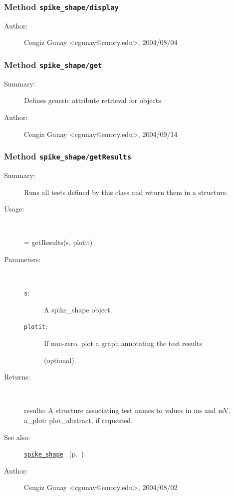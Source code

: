 \subsubsection[Method \texttt{display}]{Method \texttt{spike\_shape/display}}%
%
\label{ref_spike_shape__display}%
\hypertarget{ref_spike_shape__display}{}%
\begin{description}
%
%
%
%
%
%
%
\item[Author:]%
Cengiz Gunay <cgunay@emory.edu>, 2004/08/04
%
\end{description}
\methodline%
\subsubsection[Method \texttt{get}]{Method \texttt{spike\_shape/get}}%
%
\label{ref_spike_shape__get}%
\hypertarget{ref_spike_shape__get}{}%
\begin{description}
\item[Summary:]Defines generic attribute retrieval for objects.
%
%
%
%
%
%
%
\item[Author:]%
Cengiz Gunay <cgunay@emory.edu>, 2004/09/14
%
\end{description}
\methodline%
\subsubsection[Method \texttt{getResults}]{Method \texttt{spike\_shape/getResults}}%
%
\label{ref_spike_shape__getResults}%
\hypertarget{ref_spike_shape__getResults}{}%
\begin{description}
\item[Summary:]Runs all tests defined by this class and return them in a 
		structure.
%
\item[Usage:]~%
\begin{lyxcode}%
[results, a\_plot] = getResults(s, plotit)
%
\end{lyxcode}%
%
%
\item[Parameters:]~
\begin{description}%
\item[\texttt{s}:]
 A spike\_shape object.
\item[\texttt{plotit}:]
 If non-zero, plot a graph annotating the test results 

(optional).
\end{description}%
%
\item[Returns:
]~

	results: A structure associating test names to values in ms and mV.
	a\_plot: plot\_abstract, if requested.
%
%
\item[See also:]%
\hyperlink{ref_spike_shape}{\texttt{spike\_shape}}%
\ (p.~\pageref{ref_spike_shape})%
%
%
\item[Author:]%
Cengiz Gunay <cgunay@emory.edu>, 2004/08/02
%
\end{description}
\methodline%
